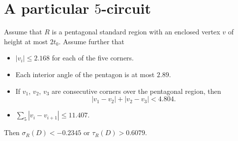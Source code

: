 %
%
%
%



\section{A particular $5$-circuit} %

\begin{lemma}\label{lemma:6079}  Assume that $R$ is a pentagonal standard region
    with an enclosed vertex $v$ of height at most $2t_0$.
    Assume further that
    \begin{itemize}
        \item $|v_i|\le 2.168$ for each of the five corners.
        \item Each interior angle of the pentagon is at most
        $2.89$.
        \item If $v_1$, $v_2$, $v_3$ are consecutive corners over
        the pentagonal region, then $$|v_1-v_2|+|v_2-v_3|<4.804.$$
        \item $\sum_5 |v_i-v_{i+1}|\le 11.407.$
    \end{itemize}
    Then $\sigma_R(D)< -0.2345$ or $\tau_R(D) > 0.6079.$
\end{lemma}

